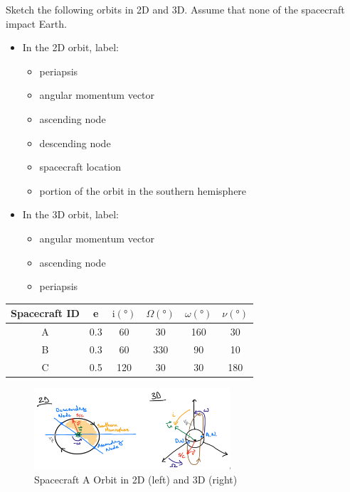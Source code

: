 \begin{hwkProblem}{4}{}
	Sketch the following orbits in 2D and 3D. Assume that none of the spacecraft impact Earth.
	\begin{itemize}
		\item In the 2D orbit, label:
			\begin{itemize}
				\item periapsis
				\item angular momentum vector
				\item ascending node
				\item descending node
				\item spacecraft location
				\item portion of the orbit in the southern hemisphere
			\end{itemize}
		\item In the 3D orbit, label:
			\begin{itemize}
				\item angular momentum vector
				\item ascending node
				\item periapsis
			\end{itemize}
	\end{itemize}
	\begin{center}
		\begin{tabular}{cccccc}
			\hline
			Spacecraft ID & e & \(\mathrm{i} \left( \unit{\degree} \right) \) & \(\Omega \left( \unit{\degree} \right)\) & \(\omega \left( \unit{\degree} \right)\) & \(\nu \left( \unit{\degree} \right)\) \\
			\hline
			\hline
			A & 0.3 & 60 & 30 & 160 & 30 \\
			\hline
			B & 0.3 & 60 & 330 & 90 & 10 \\
			\hline
			C & 0.5 & 120 & 30 & 30 & 180 \\
			\hline
		\end{tabular}
	\end{center}

	\hwkSol

	\hwkPart

	\begin{figure}[H]
		\begin{center}
			\includegraphics[width=0.65\textwidth]{./images/s04a.png}
		\end{center}
		\caption{Spacecraft A Orbit in 2D (left) and 3D (right)}\label{fig:s04a}
	\end{figure}


\end{hwkProblem}
